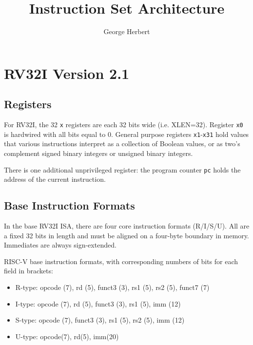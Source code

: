 \documentclass{article}
\title{Instruction Set Architecture}
\author{George Herbert}
\begin{document}
\maketitle


\section{RV32I Version 2.1}

\subsection{Registers}

For RV32I, the 32 \texttt{x} registers are each 32 bits wide (i.e. XLEN=32). Register \texttt{x0} is hardwired with all bits equal to 0. General purpose registers \texttt{x1}-\texttt{x31} hold values that various instructions interpret as a collection of Boolean values, or as two's complement signed binary integers or unsigned binary integers.

There is one additional unprivileged register: the program counter \texttt{pc} holds the address of the current instruction.

\subsection{Base Instruction Formats}

In the base RV32I ISA, there are four core instruction formats (R/I/S/U). All are a fixed 32 bits in length and must be aligned on a four-byte boundary in memory. Immediates are always sign-extended.

RISC-V base instruction formats, with corresponding numbers of bits for each field in brackets:
\begin{itemize}
    \item R-type: opcode (7), rd (5), funct3 (3), rs1 (5), rs2 (5), funct7 (7)
    \item I-type: opcode (7), rd (5), funct3 (3), rs1 (5), imm (12)
    \item S-type: opcode (7), funct3 (3), rs1 (5), rs2 (5), imm (12)
    \item U-type: opcode(7), rd(5), imm(20)
\end{itemize}
\end{document}
